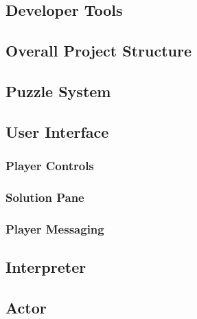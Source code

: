 \subsection{Developer Tools}

\newpage

\subsection{Overall Project Structure}

\newpage

\subsection{Puzzle System}

\newpage

\subsection{User Interface}
\subsubsection{Player Controls}
\subsubsection{Solution Pane}
\subsubsection{Player Messaging}
\newpage

\subsection{Interpreter}

\newpage

\subsection{Actor}

\newpage